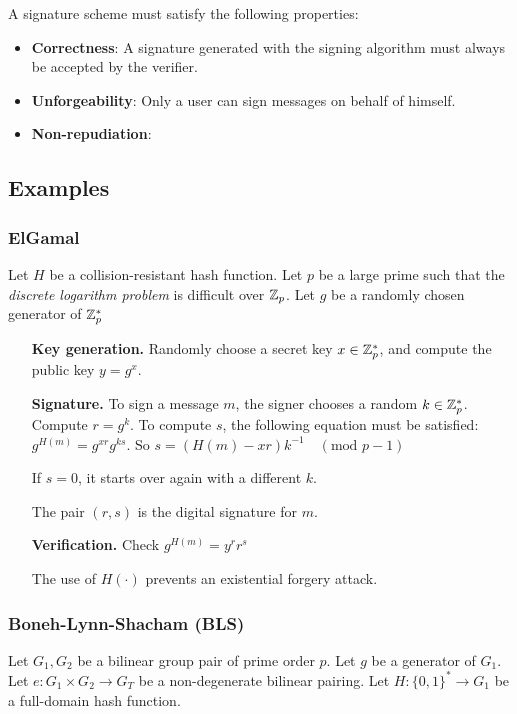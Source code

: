 A signature scheme must satisfy the following properties:
\begin{itemize}
    \item \textbf{Correctness}: A signature generated with the signing algorithm must always be accepted by the verifier.
    \item \textbf{Unforgeability}: Only a user can sign messages on behalf of himself.
    \item \textbf{Non-repudiation}: 
\end{itemize}

\subsection{Examples}
\subsubsection*{ElGamal}
\cite{elGamal85}
Let $H$ be a collision-resistant hash function. Let $p$ be a large prime such that the \textit{discrete logarithm problem} is difficult over ${\mathbb Z}_p$. Let $g$ be a randomly chosen generator of ${\mathbb Z}_p^\ast$

\begin{itemize}[align = left, leftmargin=*]
	\item[\textbf{Key generation.}]	Randomly choose a secret key $x \in {\mathbb Z}_p^\ast$, and compute the public key $y = g^x$.
	
	\item[\textbf{Signature.}]To sign a message $m$, the signer chooses a random $k \in {\mathbb Z}_p^\ast$.
Compute $ r = g^k$. To compute $s$, the following equation must be satisfied: $g^{H(m)} = g^{xr} g^{ks}$.
So $s = \left( H(m) - xr \right) k^{-1} \quad (\text{mod } p-1)$

If $s=0$, it starts over again with a different $k$.

The pair $(r,s)$ is the digital signature for $m$.

	\item[\textbf{Verification.}]Check $g^{H(m)} = y^r r^s$

The use of $H( \cdot )$ prevents an existential forgery attack.

\end{itemize}

\subsubsection*{Boneh-Lynn-Shacham (BLS)}
\label{sec:bls}
\cite{BonehLS01}
Let $G_1,G_2$ be a bilinear group pair of prime order $p$. Let $g$ be a generator of $G_1$. Let $e:G_1 \times G_2 \rightarrow G_T$ be a non-degenerate bilinear pairing. Let $H: \{0,1\}^* \rightarrow G_1$ be a full-domain hash function.

